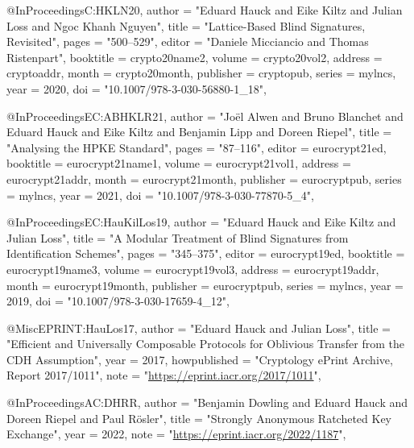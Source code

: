 @InProceedings{C:HKLN20,
  author =       "Eduard Hauck and
                  Eike Kiltz and
                  Julian Loss and
                  Ngoc Khanh Nguyen",
  title =        "Lattice-Based Blind Signatures, Revisited",
  pages =        "500--529",
  editor =       "Daniele Micciancio and Thomas Ristenpart",
  booktitle =    crypto20name2,
  volume =       crypto20vol2,
  address =      cryptoaddr,
  month =        crypto20month,
  publisher =    cryptopub,
  series =       mylncs,
  year =         2020,
  doi =          "10.1007/978-3-030-56880-1_18",
}

@InProceedings{EC:ABHKLR21,
  author =       "Jo{\"e}l Alwen and
                  Bruno Blanchet and
                  Eduard Hauck and
                  Eike Kiltz and
                  Benjamin Lipp and
                  Doreen Riepel",
  title =        "Analysing the {HPKE} Standard",
  pages =        "87--116",
  editor =       eurocrypt21ed,
  booktitle =    eurocrypt21name1,
  volume =       eurocrypt21vol1,
  address =      eurocrypt21addr,
  month =        eurocrypt21month,
  publisher =    eurocryptpub,
  series =       mylncs,
  year =         2021,
  doi =          "10.1007/978-3-030-77870-5_4",
}

@InProceedings{EC:HauKilLos19,
  author =       "Eduard Hauck and
                  Eike Kiltz and
                  Julian Loss",
  title =        "A Modular Treatment of Blind Signatures from Identification Schemes",
  pages =        "345--375",
  editor =       eurocrypt19ed,
  booktitle =    eurocrypt19name3,
  volume =       eurocrypt19vol3,
  address =      eurocrypt19addr,
  month =        eurocrypt19month,
  publisher =    eurocryptpub,
  series =       mylncs,
  year =         2019,
  doi =          "10.1007/978-3-030-17659-4_12",
}

@Misc{EPRINT:HauLos17,
  author =       "Eduard Hauck and
                  Julian Loss",
  title =        "Efficient and Universally Composable Protocols for Oblivious Transfer from the {CDH} Assumption",
  year =         2017,
  howpublished = "Cryptology ePrint Archive, Report 2017/1011",
  note =         "\url{https://eprint.iacr.org/2017/1011}",
}



@InProceedings{AC:DHRR,
  author =       "Benjamin Dowling and
                  Eduard Hauck and
                  Doreen Riepel and
                  Paul R{\"o}sler",
  title =        "Strongly Anonymous Ratcheted Key Exchange",
  year =         2022,
  note =         "\url{https://eprint.iacr.org/2022/1187}",
}

